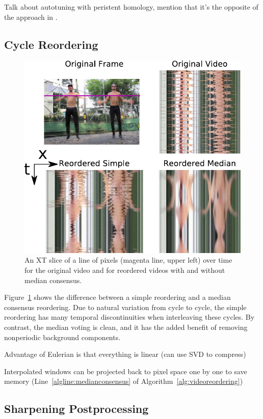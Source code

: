 \documentclass{article}
\begin{document}
Talk about autotuning with peristent homology, mention that it's the opposite of the approach in \cite{bendich2011improving}.

\subsection{Cycle Reordering}
\label{sec:cyclereordering}

\begin{figure}[h!]
\centering
\includegraphics[width=0.8\columnwidth]{XTSlice.pdf}
\caption{An XT slice of a line of pixels (magenta line, upper left) over time for the original video and for reordered videos with and without median consensus.}
\label{fig:XTSlice}
\end{figure}

Figure~\ref{fig:XTSlice} shows the difference between a simple reordering and a median consensus reordering.  Due to natural variation from cycle to cycle, the simple reordering has many temporal discontinuities when interleaving these cycles.  By contrast, the median voting is clean, and it has the added benefit of removing nonperiodic background components.

Advantage of Eulerian is that everything is linear (can use SVD to compress)

Interpolated windows can be projected back to pixel space one by one to save memory (Line~\ref{algline:medianconsensus} of Algorithm~\ref{alg:videoreordering})

\subsection{Sharpening Postprocessing}
\end{document}
